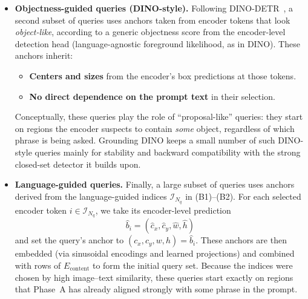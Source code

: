 \begin{enrichment}
\begin{enrichment}[Method][subsection]
\begin{itemize}
			\item \textbf{Objectness-guided queries (DINO-style).}  
			Following DINO-DETR~\cite{zhang2022_dino}, a second subset of queries uses anchors taken from encoder tokens that look \emph{object-like}, according to a generic objectness score from the encoder-level detection head (language-agnostic foreground likelihood, as in DINO). These anchors inherit:
			\begin{itemize}
				\item \textbf{Centers and sizes} from the encoder’s box predictions at those tokens.
				\item \textbf{No direct dependence on the prompt text} in their selection.
			\end{itemize}
			Conceptually, these queries play the role of “proposal-like” queries: they start on regions the encoder suspects to contain \emph{some} object, regardless of which phrase is being asked. Grounding DINO keeps a small number of such DINO-style queries mainly for stability and backward compatibility with the strong closed-set detector it builds upon.
			
			\item \textbf{Language-guided queries.}  
			Finally, a large subset of queries uses anchors derived from the language-guided indices \(\mathcal{I}_{N_q}\) in (B1)–(B2). For each selected encoder token \(i \in \mathcal{I}_{N_q}\), we take its encoder-level prediction
			\[
			\hat{b}_i = (\hat{c}_x,\hat{c}_y,\hat{w},\hat{h})
			\]
			and set the query’s anchor to \((c_x,c_y,w,h) = \hat{b}_i\). These anchors are then embedded (via sinusoidal encodings and learned projections) and combined with rows of \(E_{\text{content}}\) to form the initial query set. Because the indices were chosen by high image–text similarity, these queries start exactly on regions that Phase~A has already aligned strongly with some phrase in the prompt.
		\end{itemize}
		

\end{enrichment}
\end{enrichment}
